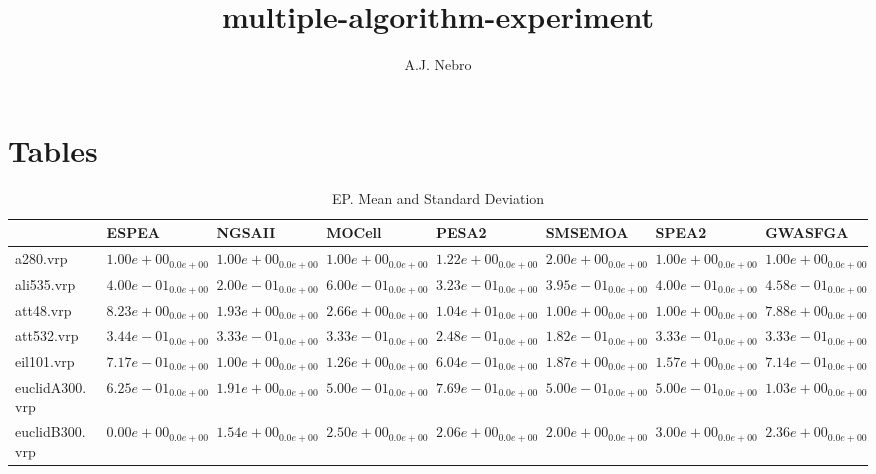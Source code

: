 \documentclass{article}
\title{multiple-algorithm-experiment}
\author{A.J. Nebro}
\begin{document}
\maketitle
\section{Tables}

\begin{table}
\caption{EP. Mean and Standard Deviation}
\label{table: EP}
\centering
\begin{scriptsize}
\begin{tabular}{llllllll}
\hline & ESPEA & NGSAII & MOCell & PESA2 & SMSEMOA & SPEA2 &  GWASFGA\\
\hline 
a280.vrp & \cellcolor{gray95}$  1.00e+00_{ 0.0e+00}$ & \cellcolor{gray25}$  1.00e+00_{ 0.0e+00}$ & $  1.00e+00_{ 0.0e+00}$ & $  1.22e+00_{ 0.0e+00}$ & $  2.00e+00_{ 0.0e+00}$ & $  1.00e+00_{ 0.0e+00}$ & $  1.00e+00_{ 0.0e+00}$ \\
ali535.vrp & $  4.00e-01_{ 0.0e+00}$ & \cellcolor{gray95}$  2.00e-01_{ 0.0e+00}$ & $  6.00e-01_{ 0.0e+00}$ & \cellcolor{gray25}$  3.23e-01_{ 0.0e+00}$ & $  3.95e-01_{ 0.0e+00}$ & $  4.00e-01_{ 0.0e+00}$ & $  4.58e-01_{ 0.0e+00}$ \\
att48.vrp & $  8.23e+00_{ 0.0e+00}$ & $  1.93e+00_{ 0.0e+00}$ & $  2.66e+00_{ 0.0e+00}$ & $  1.04e+01_{ 0.0e+00}$ & \cellcolor{gray95}$  1.00e+00_{ 0.0e+00}$ & \cellcolor{gray25}$  1.00e+00_{ 0.0e+00}$ & $  7.88e+00_{ 0.0e+00}$ \\
att532.vrp & $  3.44e-01_{ 0.0e+00}$ & $  3.33e-01_{ 0.0e+00}$ & $  3.33e-01_{ 0.0e+00}$ & \cellcolor{gray25}$  2.48e-01_{ 0.0e+00}$ & \cellcolor{gray95}$  1.82e-01_{ 0.0e+00}$ & $  3.33e-01_{ 0.0e+00}$ & $  3.33e-01_{ 0.0e+00}$ \\
eil101.vrp & $  7.17e-01_{ 0.0e+00}$ & $  1.00e+00_{ 0.0e+00}$ & $  1.26e+00_{ 0.0e+00}$ & \cellcolor{gray95}$  6.04e-01_{ 0.0e+00}$ & $  1.87e+00_{ 0.0e+00}$ & $  1.57e+00_{ 0.0e+00}$ & \cellcolor{gray25}$  7.14e-01_{ 0.0e+00}$ \\
euclidA300.vrp & $  6.25e-01_{ 0.0e+00}$ & $  1.91e+00_{ 0.0e+00}$ & \cellcolor{gray95}$  5.00e-01_{ 0.0e+00}$ & $  7.69e-01_{ 0.0e+00}$ & \cellcolor{gray25}$  5.00e-01_{ 0.0e+00}$ & $  5.00e-01_{ 0.0e+00}$ & $  1.03e+00_{ 0.0e+00}$ \\
euclidB300.vrp & \cellcolor{gray95}$  0.00e+00_{ 0.0e+00}$ & \cellcolor{gray25}$  1.54e+00_{ 0.0e+00}$ & $  2.50e+00_{ 0.0e+00}$ & $  2.06e+00_{ 0.0e+00}$ & $  2.00e+00_{ 0.0e+00}$ & $  3.00e+00_{ 0.0e+00}$ & $  2.36e+00_{ 0.0e+00}$ \\

\end{tabular}
\end{scriptsize}
\end{table}
\end{document}
